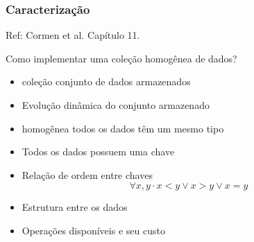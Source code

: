 \documentclass{beamer}
\begin{document}
\begin{frame}
  \frametitle{Caracterização}

  Ref: Cormen et al. Capítulo 11.
  
  Como implementar uma coleção homogênea de dados?
  \begin{itemize}
  \item \alert{coleção} conjunto de dados armazenados
  \item Evolução dinâmica do conjunto armazenado
  \item \alert{homogênea} todos os dados têm um mesmo tipo
  \item Todos os dados possuem uma \alert{chave}
  \item Relação de ordem entre chaves
    $$
    \forall x, y \cdot x < y \lor x > y \lor x = y
    $$
  \item Estrutura entre os dados
  \item Operações disponíveis e seu custo
  \end{itemize}

\end{frame}
\end{document}
